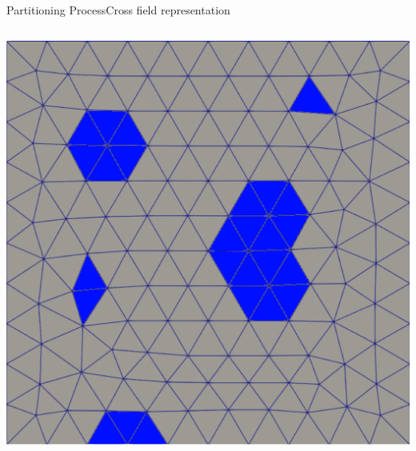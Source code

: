 \documentclass[compress,10pt,aspectratio=169]{beamer}
\begin{document}
\begin{frame}{Partitioning Process}{Cross field representation}
\begin{columns}
\begin{column}{0.2\textwidth}
{    \includegraphics[scale=0.11]{images/zone_singuliere_2.pdf} \vspace{0.2cm}}
    \end{column}
\end{columns}
\end{frame}
\end{document}
